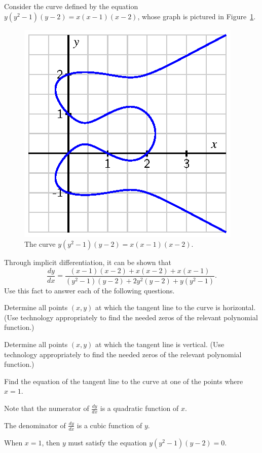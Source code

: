 \begin{activity} \label{A:2.7.2}  
Consider the curve defined by the equation $y(y^2-1)(y-2) = x(x-1)(x-2)$, whose graph is pictured in Figure~\ref{F:2.7.Act2}.
\begin{figure}[h]
\begin{center}
\includegraphics{figures/2_7_Act2.eps}
\caption{The curve $y(y^2-1)(y-2) = x(x-1)(x-2)$.} \label{F:2.7.Act2}
\end{center}
\end{figure}
Through implicit differentiation, it can be shown that
$$\frac{dy}{dx} = \frac{(x-1)(x-2) + x(x-2) + x(x-1)}{(y^2-1)(y-2) + 2y^2(y-2) + y(y^2-1)}.$$
Use this fact to answer each of the following questions.
\ba
	\item Determine all points $(x,y)$ at which the tangent line to the curve is horizontal.  (Use technology appropriately to find the needed zeros of the relevant polynomial function.)
	\item Determine all points $(x,y)$ at which the tangent line is vertical.  (Use technology appropriately to find the needed zeros of the relevant polynomial function.)
	\item Find the equation of the tangent line to the curve at one of the points where $x = 1$.  
\ea
\end{activity}
\begin{smallhint}
\ba
	\item Note that the numerator of $\frac{dy}{dx}$ is a quadratic function of $x$.
	\item The denominator of $\frac{dy}{dx}$ is a cubic function of $y$.
	\item When $x = 1$, then $y$ must satisfy the equation $y(y^2-1)(y-2) = 0$.
\ea
\end{smallhint}
